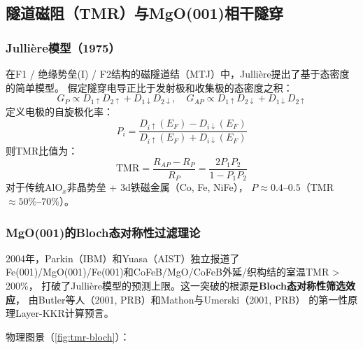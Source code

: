\documentclass[11pt,a4paper,twoside]{article}
\theoremstyle{definition}
\theoremstyle{plain}
\theoremstyle{remark}
\begin{document}
\subsection{隧道磁阻（TMR）与MgO(001)相干隧穿}
\label{sec:tmr}

\subsubsection{Julli\`{e}re模型（1975）}

在F1 / 绝缘势垒(I) / F2结构的磁隧道结（MTJ）中，Julli\`{e}re提出了基于态密度的简单模型。
假定隧穿电导正比于发射极和收集极的态密度之积：
\begin{equation}
  G_P \propto D_{1\uparrow} D_{2\uparrow} + D_{1\downarrow} D_{2\downarrow}, \quad
  G_{AP} \propto D_{1\uparrow} D_{2\downarrow} + D_{1\downarrow} D_{2\uparrow}
\end{equation}
定义电极的自旋极化率：
\begin{equation}
  P_i = \frac{D_{i\uparrow}(E_F) - D_{i\downarrow}(E_F)}
              {D_{i\uparrow}(E_F) + D_{i\downarrow}(E_F)}
\end{equation}
则TMR比值为：
\begin{equation}\label{eq:julliere}
  \boxed{ \text{TMR} = \frac{R_{AP} - R_P}{R_P}
  = \frac{2 P_1 P_2}{1 - P_1 P_2} }
\end{equation}
对于传统AlO$_x$非晶势垒 + 3d铁磁金属（Co, Fe, NiFe），
$P \approx 0.4$--$0.5$（TMR $\approx 50\%$--$70\%$）。

\subsubsection{MgO(001)的Bloch态对称性过滤理论}

2004年，Parkin（IBM）和Yuasa（AIST）独立报道了
Fe(001)/MgO(001)/Fe(001)和CoFeB/MgO/CoFeB外延/织构结的室温TMR > 200\%，
打破了Julli\`{e}re模型的预测上限。这一突破的根源是\textbf{Bloch态对称性筛选效应}，
由Butler等人（2001, PRB）和Mathon与Umerski（2001, PRB）
的第一性原理Layer-KKR计算预言。

物理图景（\cref{fig:tmr-bloch}）：
\end{document}
